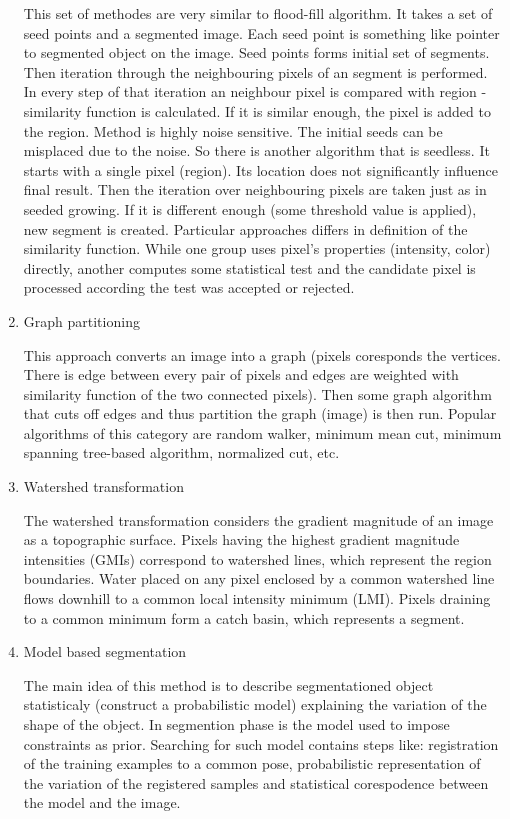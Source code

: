 \begin{enumerate}
  This set of methodes are very similar to flood-fill algorithm. It takes a set of seed points and a segmented image. Each seed point is something like pointer to segmented object on the image. Seed points forms initial set of segments. Then iteration through the neighbouring pixels of an segment is performed. In every step of that iteration an neighbour pixel is compared with region - similarity function is calculated. If it is similar enough, the pixel is added to the region.
  Method is highly noise sensitive. The initial seeds can be misplaced due to the noise. So there is another algorithm that is seedless. It starts with a single pixel (region). Its location does not significantly influence final result. Then the iteration over neighbouring pixels are taken just as in seeded growing. If it is different enough (some threshold value is applied), new segment is created.
  Particular approaches differs in definition of the similarity function. While one group uses pixel's properties (intensity, color) directly, another computes some statistical test and the candidate pixel is processed according the test was accepted or rejected.

  \item Graph partitioning

  This approach converts an image into a graph (pixels coresponds the vertices. There is edge between every pair of pixels and edges are weighted with similarity function of the two connected pixels). Then some graph algorithm that cuts off edges and thus partition the graph (image) is then run. Popular algorithms of this category are random walker, minimum mean cut, minimum spanning tree-based algorithm, normalized cut, etc.

  \item Watershed transformation

  The watershed transformation considers the gradient magnitude of an image as a topographic surface. Pixels having the highest gradient magnitude intensities (GMIs) correspond to watershed lines, which represent the region boundaries. Water placed on any pixel enclosed by a common watershed line flows downhill to a common local intensity minimum (LMI). Pixels draining to a common minimum form a catch basin, which represents a segment.

  \item Model based segmentation

  The main idea of this method is to describe segmentationed object statisticaly (construct a probabilistic model) explaining the variation of the shape of the object. In segmention phase is the model used to impose constraints as prior. Searching for such model contains steps like: registration of the training examples to a common pose, probabilistic representation of the variation of the registered samples and statistical corespodence between the model and the image.


\end{enumerate}
